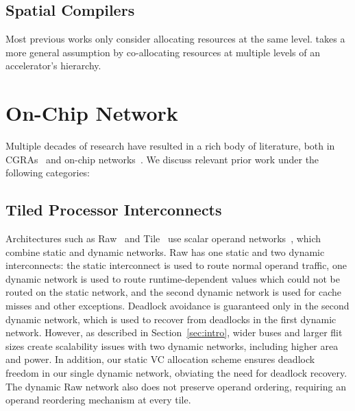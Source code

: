 \subsection{Spatial Compilers}
Most previous works \cite{nowatzki, spatial-computation} only consider allocating resources at the same level. 
\name{} takes a more general assumption by co-allocating resources at multiple levels of an accelerator's hierarchy.


\section{On-Chip Network}

Multiple decades of research have resulted in a rich body of literature, both in CGRAs~\cite{cgraSurvey1, cgraSurvey2} and on-chip networks~\cite{ocn-synthesis}. We discuss relevant prior work under the following categories:
\subsection{Tiled Processor Interconnects} Architectures such as Raw~\cite{raw} and Tile~\cite{tile} use scalar operand networks~\cite{son}, which combine static and dynamic networks. Raw has one static and two dynamic interconnects: the static interconnect is used to route normal operand traffic, one dynamic network is used to route runtime-dependent values which could not be routed on the static network, and the second dynamic network is used for cache misses and other exceptions. Deadlock avoidance is guaranteed only in the second dynamic network, which is used to recover from deadlocks in the first dynamic network. However, as described in Section~\ref{sec:intro}, wider buses and larger flit sizes create scalability issues with two dynamic networks, including higher area and power. In addition, our static VC allocation scheme ensures deadlock freedom in our single dynamic network, obviating the need for deadlock recovery.
The dynamic Raw network also does not preserve operand ordering, requiring an operand reordering mechanism at every tile.

